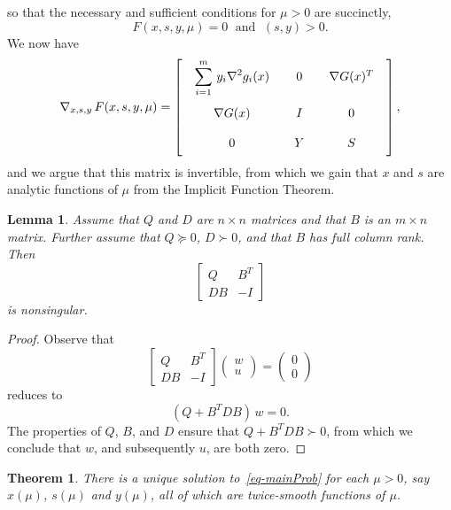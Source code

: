 \documentclass{article}
\newtheorem{theorem}{Theorem}
\newtheorem{lemma}{Lemma}
\def\pd{\succ}
\def\psd{\succeq}
\begin{document}
so that the necessary and sufficient conditions for $\mu > 0$ 
are succinctly,
\begin{equation}\label{eq-necSuffCond}
F(x,s,y,\mu) = 0 \; \mbox{ and } \; (s,y) > 0.
\end{equation}
We now have
\[
\nabla_{x,s,y} \, F(x,s,y,\mu) = \left[ 
    \renewcommand{\arraystretch}{2}
    \renewcommand{\arraycolsep}{10pt}
    \begin{array}{ccc}
    \displaystyle \sum_{i=1}^m \, y_i \nabla^2 g_i(x) & 0 &
       \nabla G(x)^T \\
    \nabla G(x) & I & 0 \\
    0 & Y & S
    \end{array} \right],
\]
and we argue that this matrix is invertible, from which we gain 
that $x$ and $s$ are analytic functions of $\mu$ from the 
Implicit Function Theorem.
\begin{lemma} \label{lemma-invMat}
Assume that $Q$ and $D$ are $n \times n$ matrices and that
$B$ is an $m \times n$ matrix. Further assume that $Q \psd 0$,
$D \pd 0$, and that $B$ has full column rank. Then
\[
\left[ \begin{array}{cc}
    Q & B^T \\[6pt] DB & -I \end{array} \right]
\]
is nonsingular.
\end{lemma}
\begin{proof}
Observe that
\[
\left[ \begin{array}{cc}
    Q & B^T \\[6pt] DB & -I \end{array} \right]
\left( \begin{array}{c} w \\ u \end{array} \right)
=
\left( \begin{array}{c} 0 \\ 0 \end{array} \right)
\]
reduces to
\[
(Q + B^T D B) \, w = 0.
\]
The properties of $Q$, $B$, and $D$ ensure that
$Q + B^T D B \pd 0$, from which we conclude that
$w$, and subsequently $u$, are both zero.
\end{proof}
\begin{theorem} \label{thm-pathSmoothness}
There is a unique solution to~\eqref{eq-mainProb} for
each $\mu > 0$, say $x(\mu)$, $s(\mu)$ and $y(\mu)$, all of
which are twice-smooth functions of $\mu$.
\end{theorem}
\end{document}
